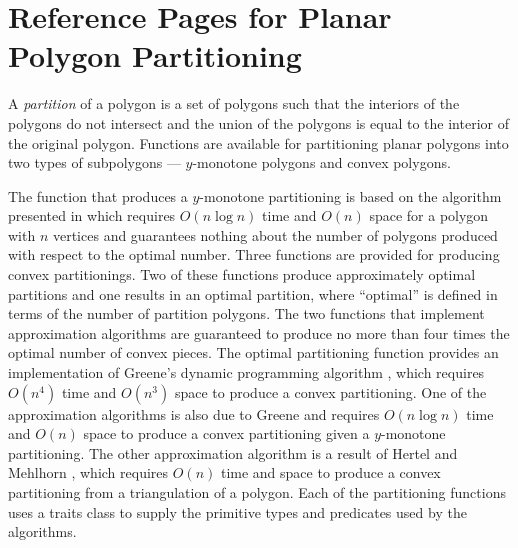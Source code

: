 
\clearpage
\section{Reference Pages for Planar Polygon Partitioning}

\lcTex{\ifnum\ccNewRefManualStyle=\ccTrue}
{
A {\em partition} of a polygon is a set 
of polygons such that the interiors of the polygons do not intersect and 
the union of the polygons is equal to the interior of the original polygon.
Functions are available for partitioning planar polygons into two 
types of subpolygons --- $y$-monotone polygons and convex polygons.  

The function that produces a $y$-monotone partitioning is based on the 
algorithm presented in \cite{bkos-cgaa-97} which requires $O(n \log n)$ time 
and $O(n)$ space for a polygon with $n$ vertices and guarantees nothing 
about the number of polygons produced with respect to the optimal number.
Three functions are provided for producing
convex partitionings. Two of these functions produce approximately optimal 
partitions and one results in an optimal partition, where ``optimal'' is
defined in terms of the number of partition polygons.   The two functions
that implement approximation algorithms are guaranteed to produce no more 
than four times the optimal number of convex pieces.  The optimal partitioning
function provides an implementation of Greene's dynamic programming algorithm
\cite{g-dpcp-83}, which requires $O(n^4)$ time and $O(n^3)$ space to produce a 
convex partitioning. One of the approximation algorithms is also due to 
Greene \cite{g-dpcp-83} and requires $O(n \log n)$ time and $O(n)$ space
to produce a convex partitioning given a $y$-monotone partitioning.  The
other approximation algorithm is a result of Hertel and
Mehlhorn \cite{hm-ftsp-83}, which requires $O(n)$ time and space to produce
a convex partitioning from a triangulation of a polygon.
Each of the partitioning functions uses a traits class to supply the
primitive types and predicates used by the algorithms.
}
\lcTex{\fi}

